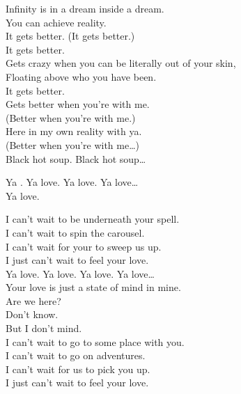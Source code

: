 Infinity is in a dream inside a dream. \\
You can achieve reality. \\
It gets better. (It gets better.) \\
It gets better. \\

Gets crazy when you can be literally out of your skin, \\
Floating above who you have been. \\
It gets better. \\
Gets better when you're with me. \\
(Better when you're with me.) \\
Here in my own reality with ya. \\
(Better when you're with me…) \\

Black hot soup. Black hot soup… \\





Ya . Ya love. Ya love. Ya love… \\

Ya love.

I can't wait to be underneath your spell. \\
I can't wait to spin the carousel. \\
I can't wait for your to sweep us up. \\
I just can't wait to feel your love. \\

Ya love. Ya love. Ya love. Ya love… \\

Your love is just a state of mind in mine. \\
Are we here? \\
Don't know. \\
But I don't mind. \\

I can't wait to go to some place with you. \\
I can't wait to go on adventures. \\
I can't wait for us to pick you up. \\
I just can't wait to feel your love. \\

